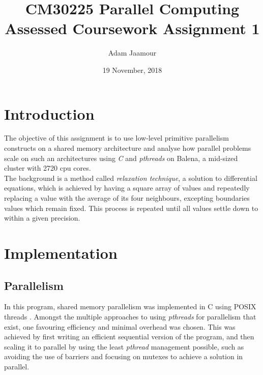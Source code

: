 \documentclass[letterpaper,12pt]{article}
\begin{document}
\title{CM30225 Parallel Computing\\Assessed Coursework Assignment 1}
\author{Adam Jaamour}
\date{19 November, 2018}
\maketitle



\section{Introduction}

The objective of this assignment is to use low-level primitive parallelism constructs on a shared memory architecture and analyse how parallel problems scale on such an architectures using \textit{C} and \textit{pthreads} on Balena, a mid-sized cluster with 2720 cpu cores\cite{balena_notes}.\\

The background is a method called \textit{relaxation technique}, a solution to differential equations, which is achieved by having a square array of values and repeatedly replacing a value with the average of its four neighbours, excepting boundaries values which remain fixed. This process is repeated until all values settle down to within a given precision.



\section{Implementation}

\subsection{Parallelism}
\label{sec:implementation_parallelism}

In this program, shared memory parallelism was implemented in C using POSIX threads \cite{posix_threads}. Amongst the multiple approaches to using \textit{pthreads} for parallelism that exist, one favouring efficiency and minimal overhead was chosen. This was achieved by first writing an efficient sequential version of the program, and then scaling it to parallel by using the least \textit{pthread} management possible, such as avoiding the use of barriers and focusing on mutexes to achieve a solution in parallel.\\
\end{document}
